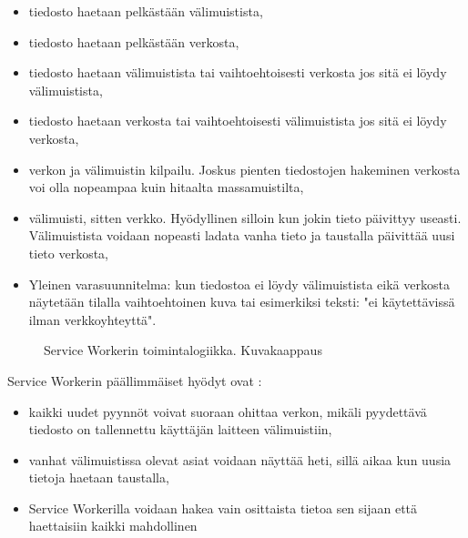 \documentclass{tktltiki}
\begin{document}
\begin{itemize}
  \item tiedosto haetaan pelkästään välimuistista,
  \item tiedosto haetaan pelkästään verkosta,
  \item tiedosto haetaan välimuistista tai vaihtoehtoisesti verkosta jos sitä ei löydy välimuistista,
  \item tiedosto haetaan verkosta tai vaihtoehtoisesti välimuistista jos sitä ei löydy verkosta,
  \item verkon ja välimuistin kilpailu. Joskus pienten tiedostojen hakeminen verkosta voi olla nopeampaa kuin hitaalta massamuistilta,
  \item välimuisti, sitten verkko. Hyödyllinen silloin kun jokin tieto päivittyy useasti. Välimuistista voidaan nopeasti ladata vanha tieto ja taustalla päivittää uusi tieto verkosta,
  \item Yleinen varasuunnitelma: kun tiedostoa ei löydy välimuistista eikä verkosta näytetään tilalla vaihtoehtoinen kuva tai esimerkiksi teksti: "ei käytettävissä ilman verkkoyhteyttä".
\end{itemize}

\begin{figure}[h]
\begin{center}
\caption{Service Workerin toimintalogiikka. Kuvakaappaus \cite{GoogleDevSummit} }
\label{Service workerin toiminta}
\end{center}
\end{figure}
\clearpage

Service Workerin päällimmäiset hyödyt ovat \cite{GoogleDevSummit}:

\begin{itemize}
  \item kaikki uudet pyynnöt voivat suoraan ohittaa verkon, mikäli pyydettävä tiedosto on tallennettu käyttäjän laitteen välimuistiin,
  \item vanhat välimuistissa olevat asiat voidaan näyttää heti, sillä aikaa kun uusia tietoja haetaan taustalla,
  \item Service Workerilla voidaan hakea vain osittaista tietoa sen sijaan että haettaisiin kaikki mahdollinen
\end{itemize}
\end{document}
